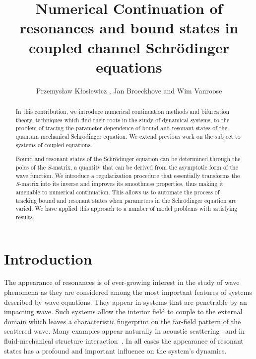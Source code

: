 \documentclass[mathpazo]{cicp}
\begin{document}
\title[Numerical Continuation of resonances]{Numerical Continuation of resonances and bound states in coupled channel Schr\"odinger equations}

\author[P.\ Klosiewicz et.\ al.]{Przemys\l{}aw K\l{}osiewicz\corrauth 
, Jan Broeckhove and Wim Vanroose}
\address{Department of Mathematics and Computer Science, Universiteit Antwerpen,\\ Middelheimlaan 1, B-2020 Antwerpen}

\begin{abstract}
In this contribution, we introduce numerical continuation methods and bifurcation theory, techniques which find their roots in the study of dynamical systems, to the problem of tracing the parameter dependence
of bound and resonant states of the quantum mechanical Schr\"o\-din\-ger equation. We extend previous work on the subject \cite{Broeckhove2009} to systems of coupled equations.

Bound and resonant states of the Schr\"o\-din\-ger equation can be determined through the poles of the $S$-matrix, a quantity that can be derived from the asymptotic form of the wave function. We introduce a regularization procedure that essentially  transforms the $S$-matrix into its inverse and improves its smoothness properties, thus making it amenable to numerical continuation. This allows us to automate the process of tracking bound and resonant states when parameters in the Schr\"o\-din\-ger equation are varied. We have applied this approach to a number of model problems with satisfying results.
\end{abstract}


\maketitle

\section{Introduction}\label{sec:Introduction}
The appearance of resonances is of ever-growing interest in the study of wave phenomena as they are considered among the most 
important features of systems described by wave equations. They appear in systems that are penetrable by an impacting wave. Such systems 
allow the interior field to couple to the external domain which leaves a characteristic fingerprint on the far-field pattern of the scattered wave. 
Many examples appear naturally in acoustic scattering~\cite{fahy2007sound} and in fluid-mechanical structure interaction~\cite{dhia2007resonances}. 
In all cases the appearance of resonant states has a profound and important influence on the system's dynamics.
\end{document}
